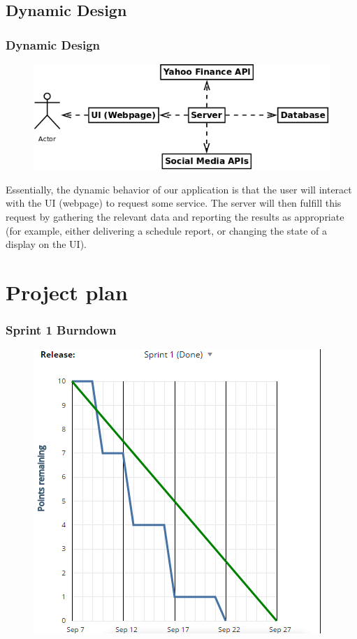 \documentclass{beamer}
\begin{document}
\subsection{Dynamic Design}

\begin{frame}
\frametitle{Dynamic Design}

\begin{figure}[h!]
  \centering
  \includegraphics[scale=0.4]{UML_block.png}
\end{figure}
Essentially, the dynamic behavior of our application is that the user will interact with the UI (webpage) to request some service. The server will then fulfill this request by gathering the relevant data and reporting the results as appropriate (for example, either delivering a schedule report, or changing the state of a display on the UI).
\end{frame}

\section{Project plan}
\begin{frame}
\frametitle{Sprint 1 Burndown}
\begin{figure}[h!]
  \centering
  \includegraphics[scale=0.5]{burndown.png}
\end{figure}
\end{frame}
\end{document}
